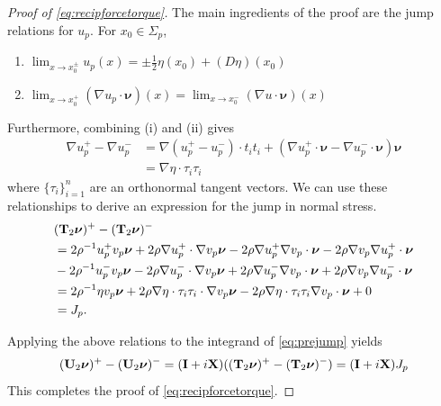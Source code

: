 \documentclass[lineno]{jfm}
\newcommand{\nnu}{\boldsymbol{\nu}}
\begin{document}
\begin{proof}[Proof of \eqref{eq:recipforcetorque}]
  The main ingredients of the proof are the jump relations
  for $u_p$. For $x_0 \in \Sigma_p$,
  \begin{enumerate}
  \item $ \lim_{x \to x_0^\pm } u_p(x) = \pm\frac{1}{2}\eta(x_0) + (D\eta)(x_0)$
  \item $ \lim_{x \to x_0^+ } (\nabla u_p \cdot \nnu) (x) = \lim_{x \to
    x_0^-} (\nabla u \cdot \nnu)(x)$
  \end{enumerate}
  Furthermore,
  combining (i) and (ii) gives
  \begin{align*}
    \nabla u_p^+ - \nabla u_p^-
    &= \nabla (u_p^+ - u_p^-) \cdot t_i t_i +  (\nabla  u_p^+\cdot
    \nnu  - \nabla u_p^- \cdot \nnu) \nnu\\
    &= \nabla \eta \cdot \tau_i \tau_i
  \end{align*}
  where $\{\tau_i\}_{i=1}^n$ are an orthonormal tangent vectors.
  We can use these relationships to derive an expression for the jump in
  normal stress.
  \begin{align*}
    &({\bf T}_2\nnu)^+ - ({\bf T}_2\nnu)^-
    \\
    &= 2\rho^{-1} u_p^+v_p \nnu + 2\rho \nabla u_p^+ \cdot \nabla v_p
    \nnu
    - 2 \rho \nabla u_p^+  \nabla v_p \cdot \nnu
    - 2 \rho \nabla v_p  \nabla u_p^+ \cdot \nnu\\
    &-2\rho^{-1} u_p^-v_p \nnu - 2\rho \nabla u_p^- \cdot \nabla v_p \nnu
    + 2 \rho \nabla u_p^-  \nabla v_p \cdot \nnu
    + 2 \rho \nabla v_p  \nabla u_p^- \cdot \nnu\\
    &= 2\rho^{-1} \eta v_p \nnu + 2\rho \nabla \eta \cdot \tau_i \tau_i
    \cdot \nabla v_p \nnu
    - 2\rho \nabla \eta \cdot \tau_i \tau_i \nabla v_p \cdot \nnu + 0\\
    &= J_p.
  \end{align*}

  Applying the above relations to the integrand of \eqref{eq:prejump} yields
  \[
  ({\bf U}_2\nnu)^+ - ({\bf U}_2\nnu)^-
  =
  ({\bf I} + i {\bf X})(({\bf T}_2\nnu)^+ - ({\bf T}_2\nnu)^-)
  = ({\bf I} + i {\bf X})J_p
  \]
  This completes the proof of \eqref{eq:recipforcetorque}.
\end{proof}







%
%
\end{document}
